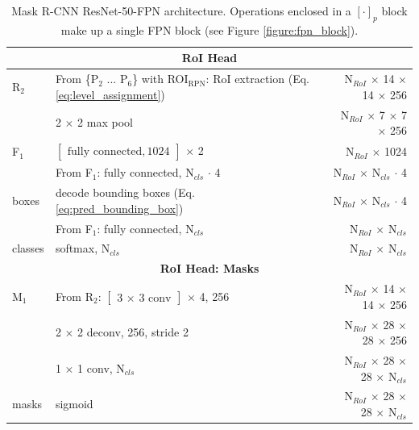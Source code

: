{\begin{table}[h]
\begin{tabular}{llr}
\multicolumn{3}{c}{\textbf{RoI Head}}\\
\midrule
R$_2$ & From \{P$_2$ ... P$_6$\} with ROI$_{\mathrm{RPN}}$: RoI extraction (Eq. \ref{eq:level_assignment}) & N$_{RoI}$ $\times$ 14 $\times$ 14 $\times$ 256 \\
& 2 $\times$ 2 max pool & N$_{RoI}$ $\times$ 7 $\times$ 7 $\times$ 256 \\
F$_1$ & $\begin{bmatrix}\textrm{fully connected}, 1024\end{bmatrix}$ $\times$ 2 & N$_{RoI}$ $\times$ 1024 \\
& From F$_1$: fully connected, N$_{cls}$ $\cdot$ 4 & N$_{RoI}$ $\times$ N$_{cls}$ $\cdot$ 4 \\
boxes & decode bounding boxes (Eq. \ref{eq:pred_bounding_box}) & N$_{RoI}$ $\times$ N$_{cls}$ $\cdot$ 4\\
& From F$_1$: fully connected, N$_{cls}$ & N$_{RoI}$ $\times$ N$_{cls}$ \\
classes& softmax, N$_{cls}$ & N$_{RoI}$ $\times$ N$_{cls}$ \\
\midrule
\multicolumn{3}{c}{\textbf{RoI Head: Masks}}\\
\midrule
M$_1$ & From R$_2$: $\begin{bmatrix}\textrm{3 $\times$ 3 conv} \end{bmatrix}$ $\times$ 4, 256 & N$_{RoI}$ $\times$ 14 $\times$ 14 $\times$ 256 \\
& 2 $\times$ 2 deconv, 256, stride 2 & N$_{RoI}$ $\times$ 28 $\times$ 28 $\times$ 256 \\
& 1 $\times$ 1 conv, N$_{cls}$ & N$_{RoI}$ $\times$ 28 $\times$ 28 $\times$ N$_{cls}$ \\
masks & sigmoid & N$_{RoI}$ $\times$ 28 $\times$ 28 $\times$ N$_{cls}$ \\
\bottomrule
\end{tabular}
\caption {
Mask R-CNN \cite{MaskRCNN} ResNet-50-FPN \cite{ResNet} architecture.
Operations enclosed in a $[\cdot]_p$ block make up a single FPN
block (see Figure \ref{figure:fpn_block}).
}
\label{table:maskrcnn_resnet_fpn}
\end{table}
}

